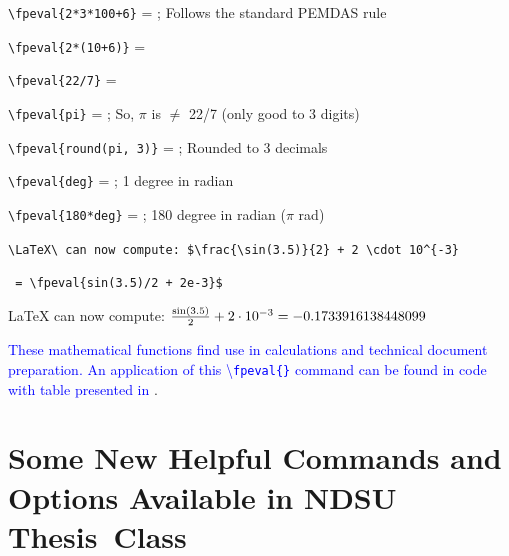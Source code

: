 \documentclass[phd,showframe]{ndsu-thesis-2022}
\newcommand\italk[1]{\textcolor{blue}{#1}}  %
\newcommand\cmd[1]{\textbackslash\texttt{#1}}  %
\newcommand\lx{\LaTeX\xspace}
\begin{document}
\verb|\fpeval{2*3*100+6}| = ; \hspace{0.15in} Follows the standard PEMDAS rule

\verb|\fpeval{2*(10+6)}| = 
   
\verb|\fpeval{22/7}| = 

\verb|\fpeval{pi}| = ; \hspace{0.15in} So, $\pi$ is $\neq$ 22/7 (only good to 3 digits)

\verb|\fpeval{round(pi, 3)}| = ; \hspace{0.15in} Rounded to 3 decimals

\verb+\fpeval{deg}+ = ; \hspace{0.15in} 1 degree in radian

\verb+\fpeval{180*deg}+ = ; \hspace{0.15in} 180 degree in radian ($\pi$ rad)

\verb|\LaTeX\ can now compute: $\frac{\sin(3.5)}{2} + 2 \cdot 10^{-3}| 

\verb| = \fpeval{sin(3.5)/2 + 2e-3}$|

\lx can now compute: $\frac{\sin(3.5)}{2} + 2 \cdot 10^{-3} = \fpeval{sin(3.5)/2 + 2e-3}$

\italk{These mathematical functions find use in calculations and technical document preparation. An application of this \cmd{fpeval\{\}} command can be found in \Cref{tab210} code with table presented in \cpageref{tab210}}. 

\section{Some New Helpful Commands and Options Available in NDSU Thesis~Class}
\end{document}
